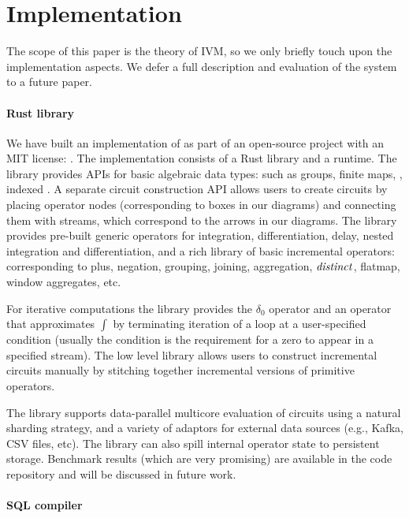 \section{Implementation}\label{sec:implementation}

The scope of this paper is the \dbsp theory of IVM, so we only briefly touch upon
the implementation aspects.  We defer a full description and evaluation of the
system to a future paper.

\paragraph{\dbsp Rust library}

We have built an implementation of \dbsp as part of an
open-source project with an MIT license: 
.
The implementation consists of a Rust library and a runtime.
The library provides APIs for basic algebraic data types:
such as groups, finite maps, \zr, indexed \zr.  
A separate circuit construction API allows users to 
create \dbsp circuits by placing operator nodes (corresponding to boxes in our diagrams)
and connecting them with streams, which correspond to the
arrows in our diagrams.  The library provides pre-built generic operators
for integration, differentiation, delay, nested integration and differentiation,
and a rich library of \zr basic incremental operators: 
corresponding to plus, negation, grouping, joining, aggregation, $\mathit{distinct}$,
flatmap, window aggregates, etc.

For iterative computations the library provides the $\delta_0$ operator and
an operator that approximates $\int$ by terminating iteration of
a loop at a user-specified condition (usually the condition is the 
requirement for a zero to appear in a specified stream).
The low level library allows users to construct incremental
circuits manually by stitching together incremental versions of primitive operators.  

The library supports data-parallel multicore evaluation of circuits
using a natural sharding strategy, and a variety
of adaptors for external data sources (e.g., Kafka, CSV files, etc).  The library can also spill internal operator state to persistent storage.  
Benchmark results (which are very promising) are available
in the code repository and will be discussed in future work.

\paragraph{SQL compiler}

